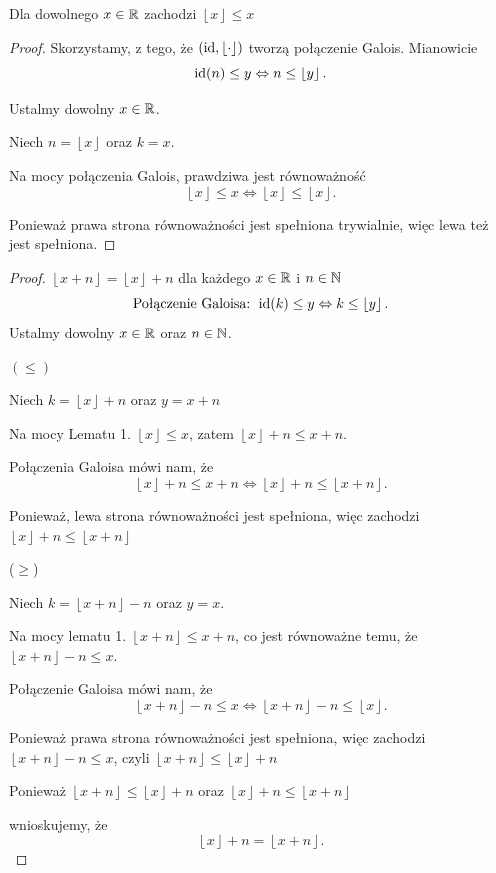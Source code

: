 \begin{lemma}
	Dla dowolnego $x \in \mathbb{R}$ zachodzi $\left\lfloor x \right\rfloor \le  x$
\end{lemma}
\begin{proof}
	Skorzystamy, z tego, że $(\operatorname{id}, \left\lfloor \cdot  \right\rfloor)$ tworzą połączenie Galois. Mianowicie
	\[
	\operatorname{id} (n) \le  y \Leftrightarrow n \le \left\lfloor y \right\rfloor
	.\] 

	Ustalmy dowolny $x \in \mathbb{R}$.

	Niech $n = \left\lfloor x \right\rfloor$ oraz $k = x$.

	Na mocy połączenia Galois, prawdziwa jest równoważność
	 \[
	\left\lfloor x \right\rfloor \le x \iff \left\lfloor x \right\rfloor \le \left\lfloor x \right\rfloor
	.\] 

	Ponieważ prawa strona równoważności jest spełniona trywialnie, 
	więc lewa też jest spełniona.
\end{proof}
\begin{proof}{$\left\lfloor x + n \right\rfloor = \left\lfloor x \right\rfloor + n$ dla każdego $x \in \mathbb{R}$ i $n \in \mathbb{N}$}
		\[
		\text{Połączenie Galoisa: } 
	\operatorname{id} (k) \le  y \Leftrightarrow k\le \left\lfloor y \right\rfloor
		.\] 	
		Ustalmy dowolny $x \in \mathbb{R}$ oraz $n \in \mathbb{N}$. 
		
		$\left( \le  \right)$ 
	
		Niech $k = \left\lfloor x \right\rfloor + n$ oraz $y = x + n$

		Na mocy Lematu 1. $\left\lfloor x \right\rfloor \le x$, zatem $\left\lfloor x \right\rfloor + n \le x + n$.

		Połączenia Galoisa mówi nam, że \[
		\left\lfloor x \right\rfloor + n \le   x + n \iff \left\lfloor x \right\rfloor + n \le \left\lfloor x+n \right\rfloor
		.\] 

		Ponieważ, lewa strona równoważności jest spełniona, więc zachodzi $\left\lfloor x \right\rfloor + n \le  \left\lfloor x+n \right\rfloor$

		($\ge$)
	
		Niech $k = \left\lfloor x+n \right\rfloor - n$ oraz
		$y = x$.

		Na mocy lematu 1.  $\left\lfloor x + n \right\rfloor \le x + n$, co jest równoważne temu, że $\left\lfloor x + n \right\rfloor - n \le  x$. 

		Połączenie Galoisa mówi nam, że 
		\[
		\left\lfloor x+n \right\rfloor-n \le x \iff \left\lfloor x+n \right\rfloor - n \le  \left\lfloor x \right\rfloor
		.\] 

		Ponieważ prawa strona równoważności jest spełniona, więc zachodzi $\left\lfloor x+n \right\rfloor - n \le  x$, czyli $\left\lfloor x + n \right\rfloor \le  \left\lfloor x \right\rfloor + n$
		

Ponieważ $\left\lfloor x + n \right\rfloor \le  \left\lfloor x \right\rfloor + n$
oraz 
$\left\lfloor x \right\rfloor + n \le  \left\lfloor x+n \right\rfloor$

wnioskujemy, że 
\[
\left\lfloor x \right\rfloor + n =  \left\lfloor x+n \right\rfloor
.\] 

\end{proof}


